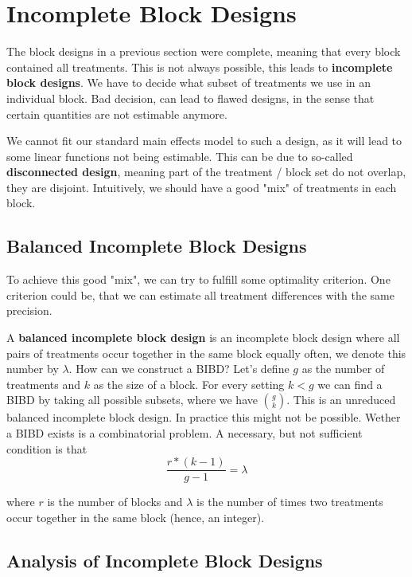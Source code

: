 \section{Incomplete Block Designs}

The block designs in a previous section were complete, meaning that every block contained all treatments. This is not always possible, this leads to \textbf{incomplete block designs}. We have to decide what subset of treatments we use in an individual block. Bad decision, can lead to flawed designs, in the sense that certain quantities are not estimable anymore. \medskip

We cannot fit our standard main effects model to such a design, as it will lead to some linear functions not being estimable. This can be due to so-called \textbf{disconnected design}, meaning part of the treatment / block set do not overlap, they are disjoint. Intuitively, we should have a good "mix" of treatments in each block.


\subsection{Balanced Incomplete Block Designs}

To achieve this good "mix",  we can try to fulfill some optimality criterion. One criterion could be, that we can estimate all treatment differences with the same precision. \medskip

A \textbf{balanced incomplete block design} is an incomplete block design where all pairs of treatments occur together in the same block equally often, we denote this number by $\lambda$.  How can we construct a BIBD? Let's define $g$ as the number of treatments and $k$ as the size of a block. For every setting $k < g$ we can find a BIBD by taking all possible subsets, where we have $\binom{g}{k}$. This is an unreduced balanced incomplete block design. In practice this might not be possible. Wether a BIBD exists is a combinatorial problem. A necessary, but not sufficient condition is that 
$$\frac{r * (k - 1)}{g - 1} = \lambda$$

where $r$ is the number of blocks and $\lambda$ is the number of times two treatments occur together in the same block (hence, an integer).


\subsection{Analysis of Incomplete Block Designs} 

